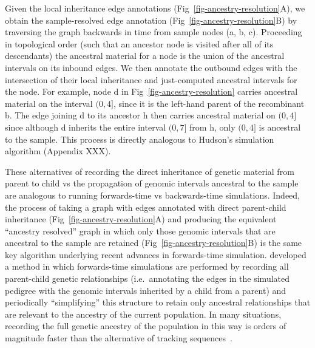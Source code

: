 \documentclass{article}
\begin{document}
Given the local inheritance edge annotations
(Fig~\ref{fig-ancestry-resolution}A),
 we obtain the sample-resolved edge annotation
(Fig~\ref{fig-ancestry-resolution}B) by traversing the graph backwards in time
from sample nodes (\textsf{a}, \textsf{b}, \textsf{c}).
Proceeding in topological order (such that an ancestor node is visited
after all of its descendants) the ancestral material for a node is the
union of the ancestral intervals on its inbound edges. We then annotate
the outbound edges with the intersection of their local inheritance and
just-computed ancestral intervals for the node.
For example, node \textsf{d} in Fig~\ref{fig-ancestry-resolution}
carries ancestral material on the interval $(0, 4]$, since it
is the left-hand parent of the recombinant \textsf{b}. The edge
joining \textsf{d} to its ancestor \textsf{h} then carries ancestral
material on $(0, 4]$ since although \textsf{d} inherits the entire interval
$(0, 7]$ from \textsf{h}, only $(0, 4]$ is ancestral to the sample.
This process is directly analogous to Hudson's simulation algorithm
(Appendix XXX).

These alternatives of recording the direct inheritance of genetic material from
parent to child vs the propagation of genomic intervals ancestral to the sample
are analogous to running forwards-time vs backwards-time simulations.
Indeed, the process of taking a graph with edges annotated with direct parent-child
inheritance (Fig~\ref{fig-ancestry-resolution}A) and producing the equivalent
``ancestry resolved'' graph in which only those genomic intervals that are
ancestral to the sample are retained (Fig~\ref{fig-ancestry-resolution}B)
is the same key algorithm underlying recent advances in forwards-time simulation.
\cite{kelleher2018efficient} developed a method in which forwards-time
simulations are performed by recording all parent-child genetic relationships
(i.e.~annotating the edges in the simulated pedigree with the genomic
intervals inherited by a child from a parent) and periodically ``simplifying''
this structure to retain only ancestral relationships that are relevant
to the ancestry of the current population. In many situations, recording
the full genetic ancestry of the population in this way is orders of magnitude faster
than the alternative of tracking
sequences~\citep{kelleher2018efficient,haller2018tree}.
\end{document}
